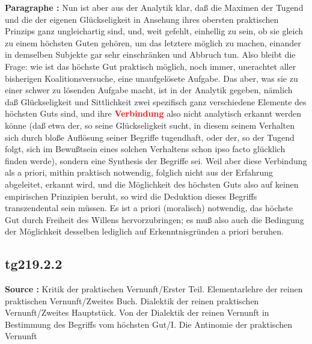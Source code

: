\documentclass[a4paper,12pt,twoside]{book}
\newcommand{\match}[1]{\textcolor{red}{\textbf{#1}}}
\begin{document}
	\textbf{Paragraphe : }Nun ist aber aus der Analytik klar, daß die Maximen der Tugend und die der eigenen Glückseligkeit in Ansehung ihres obersten praktischen Prinzips ganz ungleichartig sind, und, weit gefehlt, einhellig zu sein, ob sie gleich zu einem höchsten Guten gehören, um das letztere möglich zu machen, einander in demselben Subjekte gar sehr einschränken und Abbruch tun. Also bleibt die Frage: wie ist das höchste Gut praktisch möglich, noch immer, unerachtet aller bisherigen Koalitionsversuche, eine unaufgelösete Aufgabe. Das aber, was sie zu einer schwer zu lösenden Aufgabe macht, ist in der Analytik gegeben, nämlich daß Glückseligkeit und Sittlichkeit zwei spezifisch ganz verschiedene Elemente des höchsten Guts sind, und ihre \match{Verbindung} also nicht analytisch erkannt werden könne (daß etwa der, so seine Glückseligkeit sucht, in diesem seinem Verhalten sich durch bloße Auflösung seiner Begriffe tugendhaft, oder der, so der Tugend folgt, sich im Bewußtsein eines solchen Verhaltens schon ipso facto glücklich finden werde), sondern eine Synthesis der Begriffe sei. Weil aber diese Verbindung als a priori, mithin praktisch notwendig, folglich nicht aus der Erfahrung abgeleitet, erkannt wird, und die Möglichkeit des höchsten Guts also auf keinen empirischen Prinzipien beruht, so wird die Deduktion dieses Begriffs transzendental sein müssen. Es ist a priori (moralisch) notwendig, das höchste Gut durch Freiheit des Willens hervorzubringen; es muß also auch die Bedingung der Möglichkeit desselben lediglich auf Erkenntnisgründen a priori beruhen. 
	
	\subsection*{tg219.2.2} 
	\textbf{Source : }Kritik der praktischen Vernunft/Erster Teil. Elementarlehre der reinen praktischen Vernunft/Zweites Buch. Dialektik der reinen praktischen Vernunft/Zweites Hauptstück. Von der Dialektik der reinen Vernunft in Bestimmung des Begriffs vom höchsten Gut/I. Die Antinomie der praktischen Vernunft\\  
	
\end{document}
